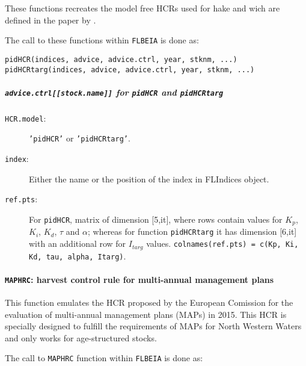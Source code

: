   These functions recreates the model free HCRs used for hake and wich are defined in the paper by \cite{Pomarede2010}.
  

  The call to these functions within \texttt{FLBEIA} is done as:

	\begin{center}
		\texttt{pidHCR(indices, advice, advice.ctrl, year, stknm, ...)} \\
		\texttt{pidHCRtarg(indices, advice, advice.ctrl, year, stknm, ...)}
	\end{center}

	\subparagraph{\texttt{advice.ctrl[[stock.name]]} for \texttt{pidHCR} and \texttt{pidHCRtarg}}

	\begin{description}
	    \item[\texttt{HCR.model}:] \texttt{'pidHCR'} or \texttt{'pidHCRtarg'}.
	    \item[\texttt{index}:] Either the name or the position of the index in FLIndices object.
		  \item[\texttt{ref.pts}:] For \texttt{pidHCR}, matrix of dimension [5,it], 
		    where rows contain values for $K_p$, $K_i$, $K_d$, $\tau$ and $\alpha$; 
		    whereas for function \texttt{pidHCRtarg} it has dimension [6,it] with an additional row for $I_{targ}$ values.
		    \texttt{colnames(ref.pts) = c(Kp, Ki, Kd, tau, alpha, Itarg)}.
	\end{description}


  \paragraph{\texttt{MAPHRC}: harvest control rule for multi-annual management plans} \hspace{0pt} \smallskip

  This function emulates the HCR proposed by the European Comission for the evaluation of multi-annual management plans (MAPs) in 2015. 
  This HCR is specially designed to fulfill the requirements of MAPs for North Western Waters and only works for age-structured stocks.

  
  The call to \texttt{MAPHRC} function within \texttt{FLBEIA} is done as:

